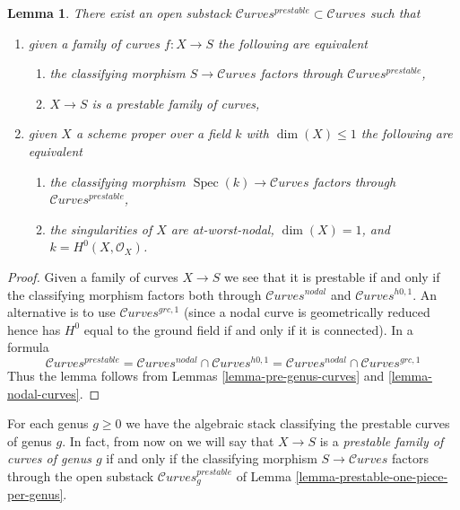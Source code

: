 \documentclass{stacks-project}
\theoremstyle{plain}
\newtheorem{lemma}[subsection]{Lemma}
\theoremstyle{definition}
\theoremstyle{remark}
\numberwithin{equation}{subsection}
\def\Spec{\mathop{\mathrm{Spec}}}
\def\Curvesstack{\mathcal{C}\!\mathit{urves}}
\begin{document}
\begin{lemma}
\label{lemma-prestable-curves}
There exist an open substack $\Curvesstack^{prestable} \subset \Curvesstack$
such that
\begin{enumerate}
\item given a family of curves $f : X \to S$ the following are equivalent
\begin{enumerate}
\item the classifying morphism $S \to \Curvesstack$ factors
through $\Curvesstack^{prestable}$,
\item $X \to S$ is a prestable family of curves,
\end{enumerate}
\item given $X$ a scheme proper over a field $k$ with
$\dim(X) \leq 1$ the following are equivalent
\begin{enumerate}
\item the classifying morphism $\Spec(k) \to \Curvesstack$
factors through $\Curvesstack^{prestable}$,
\item the singularities of $X$ are at-worst-nodal, $\dim(X) = 1$,
and $k = H^0(X, \mathcal{O}_X)$.
\end{enumerate}
\end{enumerate}
\end{lemma}

\begin{proof}
Given a family of curves $X \to S$ we see that it is prestable if
and only if the classifying morphism factors both through
$\Curvesstack^{nodal}$ and $\Curvesstack^{h0, 1}$. An alternative
is to use $\Curvesstack^{grc, 1}$ (since a nodal curve is geometrically
reduced hence has $H^0$ equal to the ground field if and only if
it is connected). In a formula
$$
\Curvesstack^{prestable} =
\Curvesstack^{nodal} \cap \Curvesstack^{h0, 1} =
\Curvesstack^{nodal} \cap \Curvesstack^{grc, 1}
$$
Thus the lemma follows from
Lemmas \ref{lemma-pre-genus-curves} and \ref{lemma-nodal-curves}.
\end{proof}

\noindent
For each genus $g \geq 0$ we have the algebraic stack classifying
the prestable curves of genus $g$. In fact, from now on we will say
that $X \to S$ is a {\it prestable family of curves of genus $g$}
if and only if the classifying morphism $S \to \Curvesstack$ factors through
the open substack $\Curvesstack^{prestable}_g$ of
Lemma \ref{lemma-prestable-one-piece-per-genus}.
\end{document}
